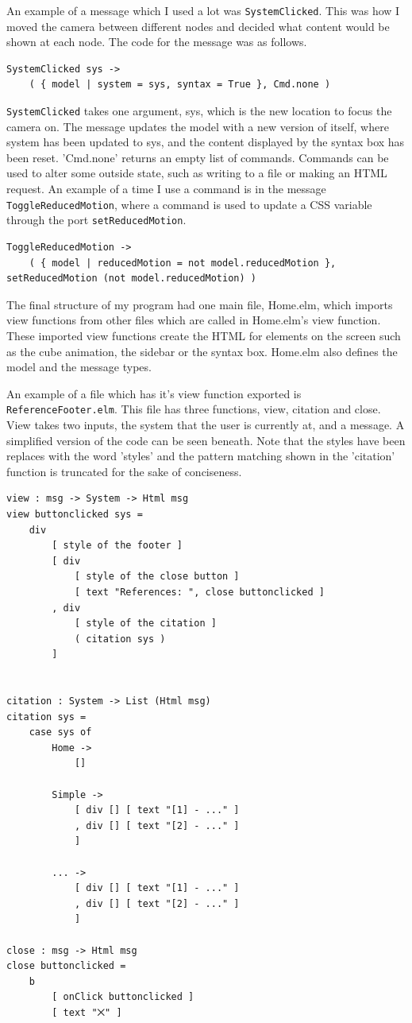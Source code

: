\documentclass{l4proj}
\begin{document}
An example of a message which I used a lot was \texttt{SystemClicked}.  This was how I moved the camera between different nodes and decided what content would be shown at each node.  The code for the message was as follows.

\begin{lstlisting}
SystemClicked sys ->
    ( { model | system = sys, syntax = True }, Cmd.none )
\end{lstlisting}

\texttt{SystemClicked} takes one argument, sys, which is the new location to focus the camera on.  The message updates the model with a new version of itself, where system has been updated to sys, and the content displayed by the syntax box has been reset.  'Cmd.none' returns an empty list of commands.  Commands can be used to alter some outside state, such as writing to a file or making an HTML request.  An example of a time I use a command is in the message \texttt{ToggleReducedMotion}, where a command is used to update a CSS variable through the port \texttt{setReducedMotion}.

\begin{lstlisting}
ToggleReducedMotion ->
    ( { model | reducedMotion = not model.reducedMotion }, setReducedMotion (not model.reducedMotion) )
\end{lstlisting}

The final structure of my program had one main file, Home.elm, which imports view functions from other files which are called in Home.elm's view function.  These imported view functions create the HTML for elements on the screen such as the cube animation, the sidebar or the syntax box.  Home.elm also defines the model and the message types.

An example of a file which has it's view function exported is \texttt{ReferenceFooter.elm}.  This file has three functions, view, citation and close.  View takes two inputs, the system that the user is currently at, and a message.  A simplified version of the code can be seen beneath.  Note that the styles have been replaces with the word 'styles' and the pattern matching shown in the 'citation' function is truncated for the sake of conciseness.

\begin{lstlisting} 
view : msg -> System -> Html msg
view buttonclicked sys =
    div 
        [ style of the footer ]
        [ div
            [ style of the close button ]
            [ text "References: ", close buttonclicked ]
        , div
            [ style of the citation ]
            ( citation sys )
        ]


citation : System -> List (Html msg)
citation sys =
    case sys of
        Home ->
            []

        Simple ->
            [ div [] [ text "[1] - ..." ]
            , div [] [ text "[2] - ..." ]
            ]

        ... ->
            [ div [] [ text "[1] - ..." ]
            , div [] [ text "[2] - ..." ]
            ]
        
close : msg -> Html msg
close buttonclicked =
    b
        [ onClick buttonclicked ]
        [ text "⨉" ]
\end{lstlisting}
\end{document}
